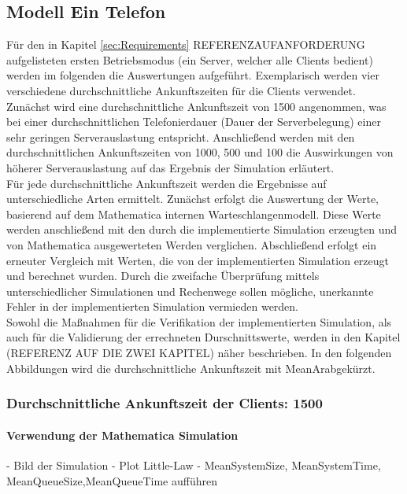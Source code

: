\subsection{Modell \glqq Ein Telefon\grqq} 
Für den in Kapitel \ref{sec:Requirements} REFERENZAUFANFORDERUNG aufgelisteten ersten Betriebsmodus (ein Server, welcher alle Clients bedient) werden im folgenden die Auswertungen aufgeführt. Exemplarisch werden vier verschiedene durchschnittliche Ankunftszeiten für die Clients verwendet. Zunächst wird eine durchschnittliche Ankunftszeit von 1500 angenommen, was bei einer durchschnittlichen Telefonierdauer (Dauer der Serverbelegung) einer sehr geringen Serverauslastung entspricht. Anschließend werden mit den durchschnittlichen Ankunftszeiten von 1000, 500 und 100 die Auswirkungen von höherer Serverauslastung auf das Ergebnis der Simulation erläutert. \\
Für jede durchschnittliche Ankunftszeit werden die Ergebnisse auf unterschiedliche Arten ermittelt. Zunächst erfolgt die Auswertung der Werte, basierend auf dem Mathematica internen Warteschlangenmodell. Diese Werte werden anschließend mit den durch die implementierte Simulation erzeugten und von Mathematica ausgewerteten Werden verglichen. Abschließend erfolgt ein erneuter Vergleich mit Werten, die von der implementierten Simulation erzeugt und berechnet wurden. Durch die zweifache Überprüfung mittels unterschiedlicher Simulationen und Rechenwege sollen mögliche, unerkannte Fehler in der implementierten Simulation vermieden werden. \\
Sowohl die Maßnahmen für die Verifikation der implementierten Simulation, als auch für die Validierung der errechneten Durschnittswerte, werden in den Kapitel (REFERENZ AUF DIE ZWEI KAPITEL) näher beschrieben. In den folgenden Abbildungen wird die durchschnittliche Ankunftszeit mit \glqq MeanAr\grqq abgekürzt.


\subsubsection{Durchschnittliche Ankunftszeit der Clients: 1500}
\paragraph{Verwendung der Mathematica Simulation}
- Bild der Simulation 
- Plot Little-Law
- MeanSystemSize, MeanSystemTime, MeanQueueSize,MeanQueueTime aufführen

